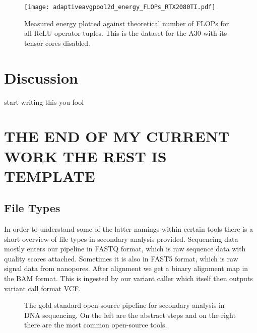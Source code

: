\documentclass[conference]{IEEEtran}
\begin{document}
\begin{figure}
    \texttt{[image: adaptiveavgpool2d\_energy\_FLOPs\_RTX2080TI.pdf]}
    \caption{Measured energy plotted against theoretical number of FLOPs for all ReLU operator tuples. This is the dataset for the A30 with its tensor cores disabled.}
    \label{fig:relua30notc}
\end{figure}


\section{Discussion}
start writing this you fool

\section{THE END OF MY CURRENT WORK THE REST IS TEMPLATE}

\subsection{File Types}
In order to understand some of the latter namings within certain tools there is a short overview of file types in secondary analysis provided. Sequencing data mostly enters our pipeline in FASTQ format, which is raw sequence data with quality scores attached. Sometimes it is also in FAST5 format, which is raw signal data from nanopores. After alignment we get a binary alignment map in the BAM format. This is ingested by our variant caller which itself then outputs variant call format VCF. \\




    
\begin{figure}
    \centering
    \caption{The gold standard open-source pipeline for secondary analysis in DNA sequencing. On the left are the abstract steps and on the right there are the most common open-source tools.}
    \label{fig:enter-label}
\end{figure}
\end{document}
